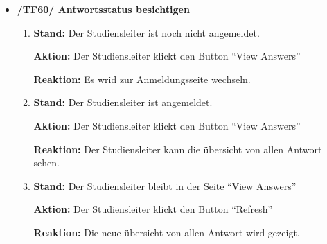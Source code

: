 \documentclass[a4paper]{scrreprt}
\begin{document}
\begin{itemize}
\begin{enumerate}
                    \end{enumerate}


                \item \textbf{/TF60/ Antwortsstatus besichtigen}
                    \begin{enumerate}
                        \item \par \textbf{Stand: } Der \gls{Studiensleiter} ist noch nicht angemeldet.
                              \par \textbf{Aktion: } Der \gls{Studiensleiter} klickt den Button ``View Answers''
                              \par \textbf{Reaktion: } Es wrid zur Anmeldungsseite wechseln.

                        \item \par \textbf{Stand: } Der \gls{Studiensleiter} ist angemeldet.
                              \par \textbf{Aktion: } Der \gls{Studiensleiter} klickt den Button ``View Answers''
                              \par \textbf{Reaktion: } Der \gls{Studiensleiter} kann die \"ubersicht von allen Antwort sehen.

                        \item \par \textbf{Stand: } Der \gls{Studiensleiter} bleibt in der Seite ``View Answers''
                              \par \textbf{Aktion: } Der \gls{Studiensleiter} klickt den Button ``Refresh''
                              \par \textbf{Reaktion: } Die neue \"ubersicht von allen Antwort wird gezeigt.


\end{enumerate}
\end{itemize}
\end{document}
